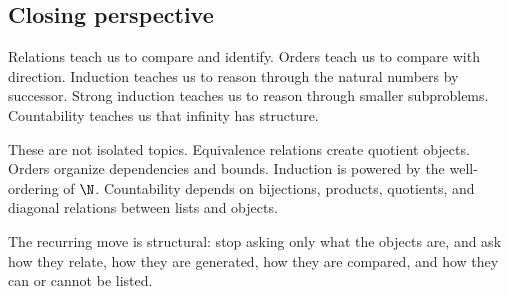 \subsection{Closing perspective}

Relations teach us to compare and identify. Orders teach us to compare with direction. Induction teaches us to reason through the natural numbers by successor. Strong induction teaches us to reason through smaller subproblems. Countability teaches us that infinity has structure.

These are not isolated topics. Equivalence relations create quotient objects. Orders organize dependencies and bounds. Induction is powered by the well-ordering of $\N$. Countability depends on bijections, products, quotients, and diagonal relations between lists and objects.

\begin{focusbox}
The recurring move is structural: stop asking only what the objects are, and ask how they relate, how they are generated, how they are compared, and how they can or cannot be listed.
\end{focusbox}

